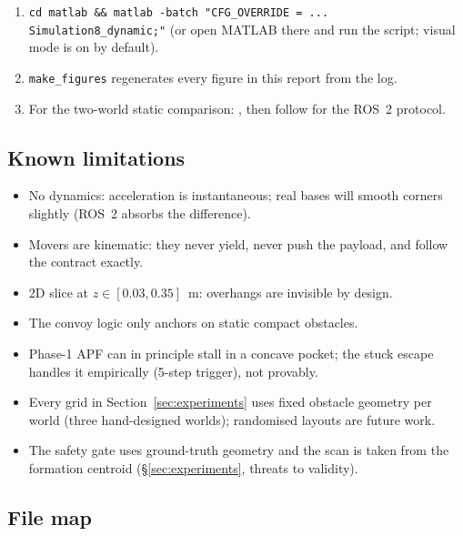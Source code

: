 \begin{enumerate}[leftmargin=1.9em]
\item \texttt{cd matlab \&\& matlab -batch "CFG_OVERRIDE = ... Simulation8\_dynamic;"}
(or open MATLAB there and run the script; visual mode is on by default).
\item \texttt{make\_figures} regenerates every figure in this report from the
log.
\item For the two-world static comparison: , then
follow  for the ROS~2 protocol.
\end{enumerate}

\subsection{Known limitations}

\begin{itemize}[leftmargin=1.6em]
\item No dynamics: acceleration is instantaneous; real bases will smooth
corners slightly (ROS~2  absorbs the difference).
\item Movers are kinematic: they never yield, never push the payload, and
follow the contract exactly.
\item 2D slice at $z \in [0.03, 0.35]$~m: overhangs are invisible by design.
\item The convoy logic only anchors on static compact obstacles.
\item Phase-1 APF can in principle stall in a concave pocket; the stuck
escape handles it empirically (5-step trigger), not provably.
\item Every grid in Section~\ref{sec:experiments} uses fixed obstacle
geometry per world (three hand-designed worlds); randomised layouts are
future work.
\item The safety gate uses ground-truth geometry and the scan is taken from
the formation centroid (\S\ref{sec:experiments}, threats to validity).
\end{itemize}

\subsection{File map}

